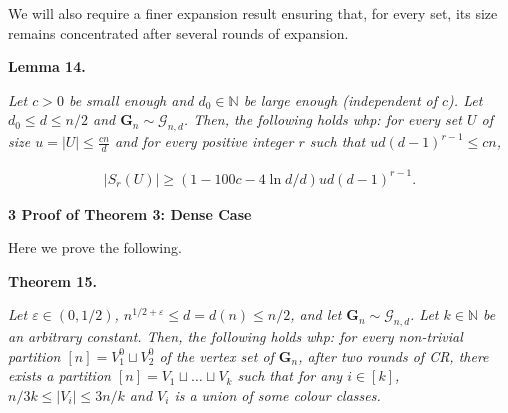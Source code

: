 \documentclass[10pt,a4paper]{article}
\begin{document}



We will also require a finer expansion result ensuring that, for every set, its size remains concentrated after several rounds of expansion.\par





\par\medskip\noindent\textbf{
\textbf{Lemma 14}\textbf{.}
}\par



\emph{Let $c>0$ be small enough and $d_{0}\in\mathbb{N}$ be large enough (independent of $c$). Let $d_{0}\leq d\leq n/2$ and $\mathbf{G}_{n}\sim\mathcal{G}_{n,d}$. Then, the following holds whp:
for every set $U$ of size $u=|U|\leq\frac{cn}{d}$ and for every positive integer $r$ such that $ud(d-1)^{r-1}\leq cn$,}\par


\[\begin{gathered}
|S_{r}(U)|\geq(1-100c-4\ln d/d)ud(d-1)^{r-1}.
\end{gathered}\]








\par\medskip\noindent\textbf{
3 Proof of Theorem 3: Dense Case}\par




Here we prove the following.\par





\par\medskip\noindent\textbf{
\textbf{Theorem 15}\textbf{.}
}\par



\emph{Let $\varepsilon\in(0,1/2)$, $n^{1/2+\varepsilon}\leq d=d(n)\leq n/2$, and let $\mathbf{G}_{n}\sim\mathcal{G}_{n,d}$. Let $k\in\mathbb{N}$ be an arbitrary constant. Then, the following holds whp: for every non-trivial partition $[n]=V_{1}^{0}\sqcup V_{2}^{0}$ of the vertex set of $\mathbf{G}_{n}$, after two rounds of CR, there exists a partition $[n]=V_{1}\sqcup\ldots\sqcup V_{k}$ such that for any $i\in[k]$, $n/3k\leq|V_{i}|\leq 3n/k$ and $V_{i}$ is a union of some colour classes.}\par
\end{document}
